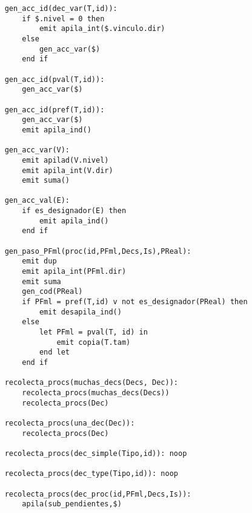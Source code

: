 \begin{lstlisting}
    gen_acc_id(dec_var(T,id)):
        if $.nivel = 0 then
            emit apila_int($.vinculo.dir)
        else
            gen_acc_var($)
        end if
    
    gen_acc_id(pval(T,id)):
        gen_acc_var($)
       
    gen_acc_id(pref(T,id)):
        gen_acc_var($)
        emit apila_ind()
    
    gen_acc_var(V):
        emit apilad(V.nivel)
        emit apila_int(V.dir)
        emit suma()
       
    gen_acc_val(E):
        if es_designador(E) then
            emit apila_ind()
        end if
    
    gen_paso_PFml(proc(id,PFml,Decs,Is),PReal):
        emit dup
        emit apila_int(PFml.dir)
        emit suma
        gen_cod(PReal)
        if PFml = pref(T,id) v not es_designador(PReal) then
            emit desapila_ind()
        else
            let PFml = pval(T, id) in
                emit copia(T.tam)
            end let
        end if
        
    recolecta_procs(muchas_decs(Decs, Dec)):
        recolecta_procs(muchas_decs(Decs))
        recolecta_procs(Dec)
    
    recolecta_procs(una_dec(Dec)):
        recolecta_procs(Dec)

    recolecta_procs(dec_simple(Tipo,id)): noop

    recolecta_procs(dec_type(Tipo,id)): noop

    recolecta_procs(dec_proc(id,PFml,Decs,Is)): 
        apila(sub_pendientes,$)

\end{lstlisting}
